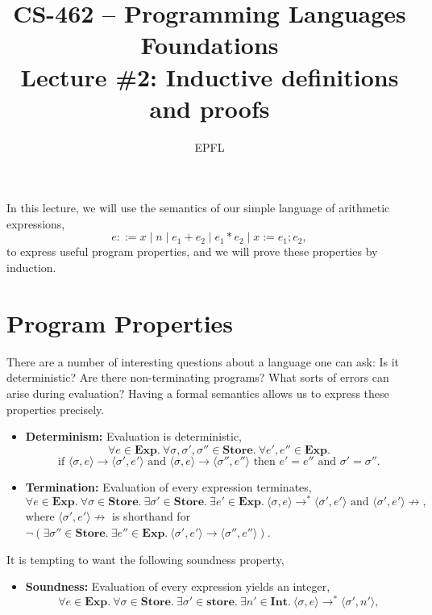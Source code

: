 \documentclass[11pt]{article}
\title{CS-462 -- Programming Languages Foundations \\ Lecture \#2: Inductive definitions and proofs}
\author{EPFL}
\date{}
\begin{document}
\maketitle

\noindent In this lecture, we will use the semantics of our simple language of arithmetic
expressions,
\[
e ::= x \mid n \mid e_1 + e_2 \mid e_1 * e_2 \mid x := e_1 ; e_2,
\]
to express useful program properties, and we will prove these properties by induction.

\section{Program Properties}

There are a number of interesting questions about a language one can ask: Is it deterministic?
Are there non-terminating programs? What sorts of errors can arise during evaluation? Having a
formal semantics allows us to express these properties precisely.

\begin{itemize}
    \item \textbf{Determinism:} Evaluation is deterministic,
    \[
    \forall e \in \mathbf{Exp}.\ \forall \sigma, \sigma', \sigma'' \in \mathbf{Store}.\ \forall
    e', e'' \in \mathbf{Exp}.
    \]
    \[
    \text{if } \langle \sigma, e \rangle \to \langle \sigma', e' \rangle \text{ and } \langle
    \sigma, e \rangle \to \langle \sigma'', e'' \rangle \text{ then } e' = e'' \text{ and }
    \sigma' = \sigma''.
    \]

    \item \textbf{Termination:} Evaluation of every expression terminates,
    \[
    \forall e \in \mathbf{Exp}.\ \forall \sigma \in \mathbf{Store}.\ \exists \sigma' \in
    \mathbf{Store}.\ \exists e' \in \mathbf{Exp}.\ \langle \sigma, e \rangle \to^* \langle
    \sigma', e' \rangle \text{ and } \langle \sigma', e' \rangle \not\to,
    \]
    where $\langle \sigma', e' \rangle \not\to$ is shorthand for $\neg(\exists \sigma'' \in
    \mathbf{Store}.\ \exists e'' \in \mathbf{Exp}.\ \langle \sigma', e' \rangle \to \langle
    \sigma'', e'' \rangle)$.
\end{itemize}

It is tempting to want the following soundness property,

\begin{itemize}
    \item \textbf{Soundness:} Evaluation of every expression yields an integer,
    \[
    \forall e \in \mathbf{Exp}.\ \forall \sigma \in \mathbf{Store}.\ \exists \sigma' \in
    \mathbf{store}.\ \exists n' \in \mathbf{Int}.\ \langle \sigma, e \rangle \to^* \langle
    \sigma', n' \rangle,
    \]
\end{itemize}
\end{document}

